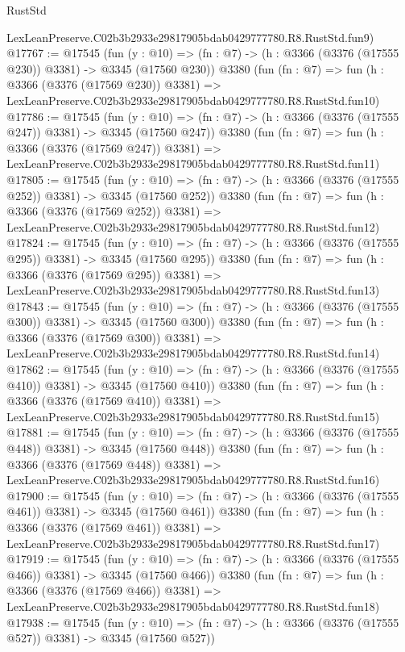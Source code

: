 \begin{lexlean}{RustStd}
\begin{coremodule}
    LexLeanPreserve.C02b3b2933e29817905bdab0429777780.R8.RustStd.fun9)
@17767 := @17545
    (fun (y : @10) => (fn : @7) -> (h : @3366 (@3376 (@17555 @230)) @3381) -> @3345 (@17560 @230))
    @3380
    (fun (fn : @7) =>
    fun (h : @3366 (@3376 (@17569 @230)) @3381) =>
    LexLeanPreserve.C02b3b2933e29817905bdab0429777780.R8.RustStd.fun10)
@17786 := @17545
    (fun (y : @10) => (fn : @7) -> (h : @3366 (@3376 (@17555 @247)) @3381) -> @3345 (@17560 @247))
    @3380
    (fun (fn : @7) =>
    fun (h : @3366 (@3376 (@17569 @247)) @3381) =>
    LexLeanPreserve.C02b3b2933e29817905bdab0429777780.R8.RustStd.fun11)
@17805 := @17545
    (fun (y : @10) => (fn : @7) -> (h : @3366 (@3376 (@17555 @252)) @3381) -> @3345 (@17560 @252))
    @3380
    (fun (fn : @7) =>
    fun (h : @3366 (@3376 (@17569 @252)) @3381) =>
    LexLeanPreserve.C02b3b2933e29817905bdab0429777780.R8.RustStd.fun12)
@17824 := @17545
    (fun (y : @10) => (fn : @7) -> (h : @3366 (@3376 (@17555 @295)) @3381) -> @3345 (@17560 @295))
    @3380
    (fun (fn : @7) =>
    fun (h : @3366 (@3376 (@17569 @295)) @3381) =>
    LexLeanPreserve.C02b3b2933e29817905bdab0429777780.R8.RustStd.fun13)
@17843 := @17545
    (fun (y : @10) => (fn : @7) -> (h : @3366 (@3376 (@17555 @300)) @3381) -> @3345 (@17560 @300))
    @3380
    (fun (fn : @7) =>
    fun (h : @3366 (@3376 (@17569 @300)) @3381) =>
    LexLeanPreserve.C02b3b2933e29817905bdab0429777780.R8.RustStd.fun14)
@17862 := @17545
    (fun (y : @10) => (fn : @7) -> (h : @3366 (@3376 (@17555 @410)) @3381) -> @3345 (@17560 @410))
    @3380
    (fun (fn : @7) =>
    fun (h : @3366 (@3376 (@17569 @410)) @3381) =>
    LexLeanPreserve.C02b3b2933e29817905bdab0429777780.R8.RustStd.fun15)
@17881 := @17545
    (fun (y : @10) => (fn : @7) -> (h : @3366 (@3376 (@17555 @448)) @3381) -> @3345 (@17560 @448))
    @3380
    (fun (fn : @7) =>
    fun (h : @3366 (@3376 (@17569 @448)) @3381) =>
    LexLeanPreserve.C02b3b2933e29817905bdab0429777780.R8.RustStd.fun16)
@17900 := @17545
    (fun (y : @10) => (fn : @7) -> (h : @3366 (@3376 (@17555 @461)) @3381) -> @3345 (@17560 @461))
    @3380
    (fun (fn : @7) =>
    fun (h : @3366 (@3376 (@17569 @461)) @3381) =>
    LexLeanPreserve.C02b3b2933e29817905bdab0429777780.R8.RustStd.fun17)
@17919 := @17545
    (fun (y : @10) => (fn : @7) -> (h : @3366 (@3376 (@17555 @466)) @3381) -> @3345 (@17560 @466))
    @3380
    (fun (fn : @7) =>
    fun (h : @3366 (@3376 (@17569 @466)) @3381) =>
    LexLeanPreserve.C02b3b2933e29817905bdab0429777780.R8.RustStd.fun18)
@17938 := @17545
    (fun (y : @10) => (fn : @7) -> (h : @3366 (@3376 (@17555 @527)) @3381) -> @3345 (@17560 @527))

\end{coremodule}
\end{lexlean}
